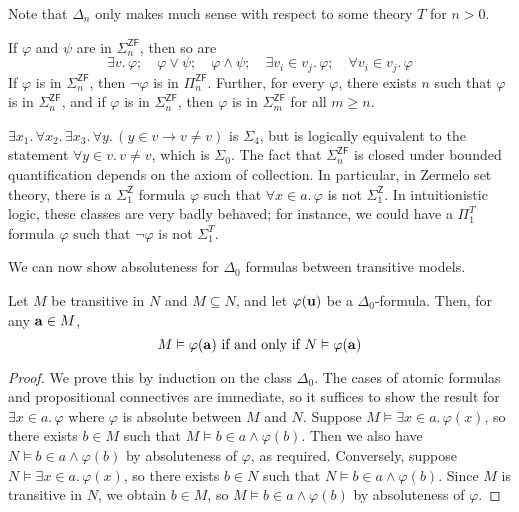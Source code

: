 Note that \( \Delta_n \) only makes much sense with respect to some theory \( T \) for \( n > 0 \).
\begin{lemma}
    If \( \varphi \) and \( \psi \) are in \( \Sigma_n^{\mathsf{ZF}} \), then so are
    \[ \exists v.\, \varphi;\quad \varphi \vee \psi;\quad \varphi \wedge \psi;\quad \exists v_i \in v_j.\, \varphi;\quad \forall v_i \in v_j.\, \varphi \]
    If \( \varphi \) is in \( \Sigma_n^{\mathsf{ZF}} \), then \( \neg\varphi \) is in \( \Pi_n^{\mathsf{ZF}} \).
    Further, for every \( \varphi \), there exists \( n \) such that \( \varphi \) is in \( \Sigma_n^{\mathsf{ZF}} \), and if \( \varphi \) is in \( \Sigma_n^{\mathsf{ZF}} \), then \( \varphi \) is in \( \Sigma_m^{\mathsf{ZF}} \) for all \( m \geq n \).
\end{lemma}
\begin{remark}
    \( \exists x_1.\, \forall x_2.\, \exists x_3.\, \forall y.\, (y \in v \to v \neq v) \) is \( \Sigma_4 \), but is logically equivalent to the statement \( \forall y \in v.\, v \neq v \), which is \( \Sigma_0 \).
    The fact that \( \Sigma_n^{\mathsf{ZF}} \) is closed under bounded quantification depends on the axiom of collection.
    In particular, in Zermelo set theory, there is a \( \Sigma_1^{\mathsf{Z}} \) formula \( \varphi \) such that \( \forall x \in a.\, \varphi \) is not \( \Sigma_1^{\mathsf{Z}} \).
    In intuitionistic logic, these classes are very badly behaved; for instance, we could have a \( \Pi_1^T \) formula \( \varphi \) such that \( \neg\varphi \) is not \( \Sigma_1^T \).
\end{remark}
We can now show absoluteness for \( \Delta_0 \) formulas between transitive models.
\begin{theorem}
    Let \( M \) be transitive in \( N \) and \( M \subseteq N \), and let \( \varphi(\vb u) \) be a \( \Delta_0 \)-formula.
    Then, for any \( \vb a \in M \),
    \[ M \vDash \varphi(\vb a) \text{ if and only if } N \vDash \varphi(\vb a) \]
\end{theorem}
\begin{proof}
    We prove this by induction on the class \( \Delta_0 \).
    The cases of atomic formulas and propositional connectives are immediate, so it suffices to show the result for \( \exists x \in a.\, \varphi \) where \( \varphi \) is absolute between \( M \) and \( N \).
    Suppose \( M \vDash \exists x \in a.\, \varphi(x) \), so there exists \( b \in M \) such that \( M \vDash b \in a \wedge \varphi(b) \).
    Then we also have \( N \vDash b \in a \wedge \varphi(b) \) by absoluteness of \( \varphi \), as required.
    Conversely, suppose \( N \vDash \exists x \in a.\, \varphi(x) \), so there exists \( b \in N \) such that \( N \vDash b \in a \wedge \varphi(b) \).
    Since \( M \) is transitive in \( N \), we obtain \( b \in M \), so \( M \vDash b \in a \wedge \varphi(b) \) by absoluteness of \( \varphi \).
\end{proof}
